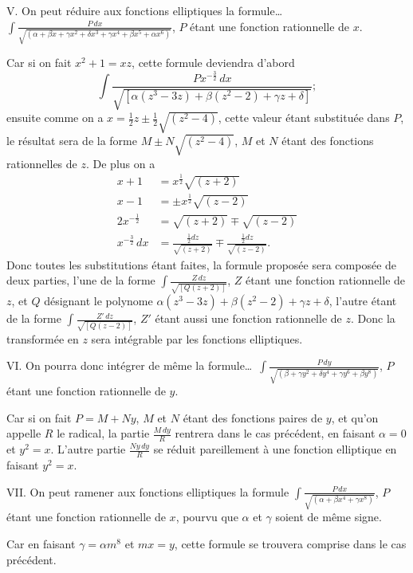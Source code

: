 \documentclass{article}
\begin{document}
V. On peut réduire aux fonctions elliptiques la formule\ldots\ $\displaystyle\int\frac{P\,dx}{\sqrt{(\alpha+\beta x+\gamma x^{2}+\delta x^{3}+\gamma x^{4}+\beta x^{5}+\alpha x^{6})}}$, $P$ étant une fonction rationnelle de $x$.


Car si on fait $x^{2}+1=xz$, cette formule deviendra d'abord
\[ \int\frac{Px^{-\frac{3}{2}}\,dx}{\sqrt{[\alpha(z^{3}-3z)+\beta(z^{2}-2)+\gamma z+\delta]}}; \]
ensuite comme on a $x=\frac{1}{2}z\pm\frac{1}{2}\sqrt{(z^{2}-4)}$, cette valeur étant substituée dans $P$, le résultat sera de la forme $M\pm N\sqrt{(z^{2}-4)}$, $M$ et $N$ étant des fonctions rationnelles de $z$. De plus on a
\[ \begin{aligned} x+1&=x^{\frac{1}{2}}\sqrt{(z+2)}\\ x-1&=\pm x^{\frac{1}{2}}\sqrt{(z-2)}\\ 2x^{-\frac{1}{2}}&=\sqrt{(z+2)}\mp\sqrt{(z-2)}\\ x^{-\frac{3}{2}}\,dx&=\frac{\tfrac{1}{2}dz}{\sqrt{(z+2)}}\mp\frac{\tfrac{1}{2}dz}{\sqrt{(z-2)}}. \end{aligned} \]
Donc toutes les substitutions étant faites, la formule proposée sera composée de deux parties, l'une de la forme $\displaystyle\int\frac{Z\,dz}{\sqrt{[Q(z+2)]}}$, $Z$ étant une fonction rationnelle de $z$, et $Q$ désignant le polynome $\alpha(z^{3}-3z)+\beta(z^{2}-2)+\gamma z+\delta$, l'autre étant de la forme $\displaystyle\int\frac{Z'\,dz}{\sqrt{[Q(z-2)]}}$, $Z'$ étant aussi une fonction rationnelle de $z$. Donc la transformée en $z$ sera intégrable par les fonctions elliptiques.

VI. On pourra donc intégrer de même la formule\ldots\ $\displaystyle\int\frac{P\,dy}{\sqrt{(\beta+\gamma y^{2}+\delta y^{4}+\gamma y^{6}+\beta y^{8})}}$, $P$ étant une fonction rationnelle de $y$.

Car si on fait $P=M+Ny$, $M$ et $N$ étant des fonctions paires de $y$, et qu'on appelle $R$ le radical, la partie $\frac{M\,dy}{R}$ rentrera dans le cas précédent, en faisant $\alpha=0$ et $y^{2}=x$. L'autre partie $\frac{Ny\,dy}{R}$ se réduit pareillement à une fonction elliptique en faisant $y^{2}=x$.

VII. On peut ramener aux fonctions elliptiques la formule $\displaystyle\int\frac{P\,dx}{\sqrt{(\alpha+\beta x^{4}+\gamma x^{8})}}$, $P$ étant une fonction rationnelle de $x$, pourvu que $\alpha$ et $\gamma$ soient de même signe.

Car en faisant $\gamma=\alpha m^{8}$ et $mx=y$, cette formule se trouvera comprise dans le cas précédent.
\end{document}
